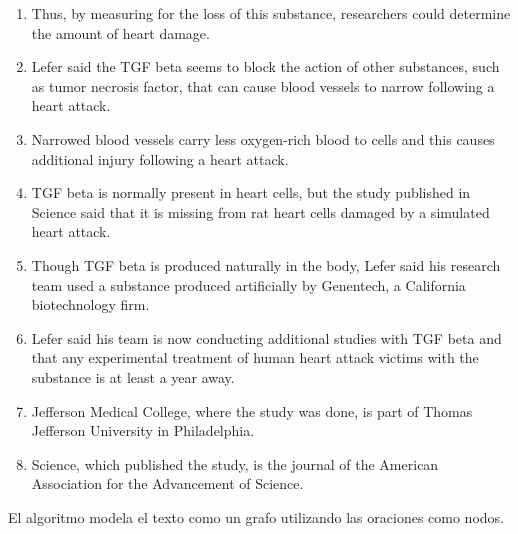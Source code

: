 \documentclass{llncs}
\begin{document}
{{{\begin{enumerate}
\item Thus, by measuring for the loss of this substance, researchers could determine the amount of heart damage.
\item Lefer said the TGF beta seems to block the action of other substances, such as tumor necrosis factor, that can cause blood vessels to narrow following a heart attack.
\item Narrowed blood vessels carry less oxygen-rich blood to cells and this causes additional injury following a heart attack.
\item TGF beta is normally present in heart cells, but the study published in Science said that it is missing from rat heart cells damaged by a simulated heart attack.
\item Though TGF beta is produced naturally in the body, Lefer said his research team used a substance produced artificially by Genentech, a California biotechnology firm.
\item Lefer said his team is now conducting additional studies with TGF beta and that any experimental treatment of human heart attack victims with the substance is at least a year away.
\item Jefferson Medical College, where the study was done, is part of Thomas Jefferson University in Philadelphia.
\item Science, which published the study, is the journal of the American Association for the Advancement of Science. 
\end{enumerate}
}
}
}

El algoritmo modela el texto como un grafo utilizando las oraciones como nodos.
\end{document}
